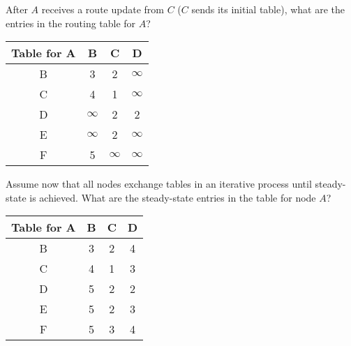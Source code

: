 \documentclass{supervision}
\begin{document}
\begin{questions}
\begin{parts}
\begin{subparts}
            \subpart After $A$ receives a route update from $C$ ($C$ sends
              its initial table), what are the entries in the routing table
              for $A$?
              \begin{solution}
                \begin{center}
                  \begin{tabular}{|c|ccc|}
                    \hline
                    Table for A & B        & C        & D        \\ \hline
                    B           & 3        & 2        & $\infty$ \\
                    C           & 4        & 1        & $\infty$ \\
                    D           & $\infty$ & 2        & 2        \\
                    E           & $\infty$ & 2        & $\infty$ \\
                    F           & 5        & $\infty$ & $\infty$ \\ \hline
                  \end{tabular}
                \end{center}
              \end{solution}

            \subpart Assume now that all nodes exchange tables in an
              iterative process until steady-state is achieved. What are the
              steady-state entries in the table for node $A$?
              \begin{solution}
                \begin{center}
                  \begin{tabular}{|c|ccc|}
                    \hline
                    Table for A & B        & C        & D        \\ \hline
                    B           & 3        & 2        & 4        \\
                    C           & 4        & 1        & 3        \\
                    D           & 5        & 2        & 2        \\
                    E           & 5        & 2        & 3        \\
                    F           & 5        & 3        & 4        \\ \hline
                  \end{tabular}
                \end{center}
              \end{solution}
          \end{subparts}


\end{parts}
\end{questions}
\end{document}
